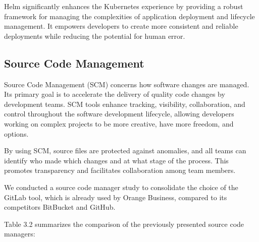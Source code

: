 Helm significantly enhances the Kubernetes experience by providing a robust framework for managing the complexities of application deployment and lifecycle management. It empowers developers to create more consistent and reliable deployments while reducing the potential for human error.


\subsection{Source Code Management}

Source Code Management (SCM) concerns how software changes are managed. Its primary goal is to accelerate the delivery of quality code changes by development teams. SCM tools enhance tracking, visibility, collaboration, and control throughout the software development lifecycle, allowing developers working on complex projects to be more creative, have more freedom, and options.

By using SCM, source files are protected against anomalies, and all teams can identify who made which changes and at what stage of the process. This promotes transparency and facilitates collaboration among team members.

We conducted a source code manager study to consolidate the choice of the GitLab tool, which is already used by Orange Business, compared to its competitors BitBucket and GitHub.

Table 3.2 summarizes the comparison of the previously presented source code managers:

\begin{table}[h]
  \centering
  \caption{Comparison of source code management tools}
\end{table}

